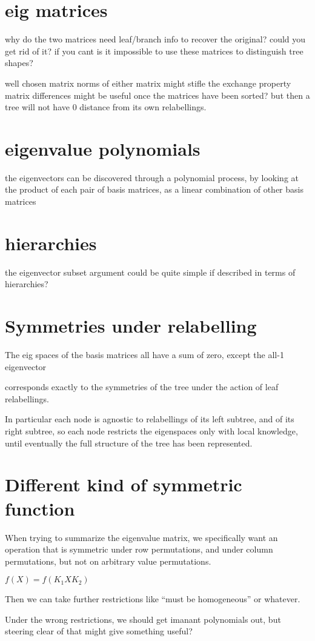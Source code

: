 \documentclass[10pt,a4paper]{report}
\begin{document}
\section{eig matrices}

why do the two matrices need leaf/branch info to recover the original? could
you get rid of it? if you cant is it impossible to use these matrices to
distinguish tree shapes?

well chosen matrix norms of either matrix might stifle the exchange property
matrix differences might be useful once the matrices have been sorted? but then
a tree will not have 0 distance from its own relabellings.

\section{eigenvalue polynomials}

the eigenvectors can be discovered through a polynomial process, by looking at
the product of each pair of basis matrices, as a linear combination of other
basis matrices

\section{hierarchies}

the eigenvector subset argument could be quite simple if described in terms of
hierarchies?

\section{Symmetries under relabelling}

The eig spaces of the basis matrices all have a sum of zero, except the all-1
eigenvector

corresponds exactly to the symmetries of the tree under the action of leaf
relabellings.

In particular each node is agnostic to relabellings of its left subtree, and of
its right subtree, so each node restricts the eigenspaces only with local
knowledge, until eventually the full structure of the tree has been
represented.

\section{Different kind of symmetric function}

When trying to summarize the eigenvalue matrix, we specifically want an
operation that is symmetric under row permutations, and under column
permutations, but not on arbitrary value permutations.

$f(X) = f(K_1XK_2)$

Then we can take further restrictions like ``must be homogeneous'' or whatever.

Under the wrong restrictions, we should get imanant polynomials out, but
steering clear of that might give something useful?
\end{document}
